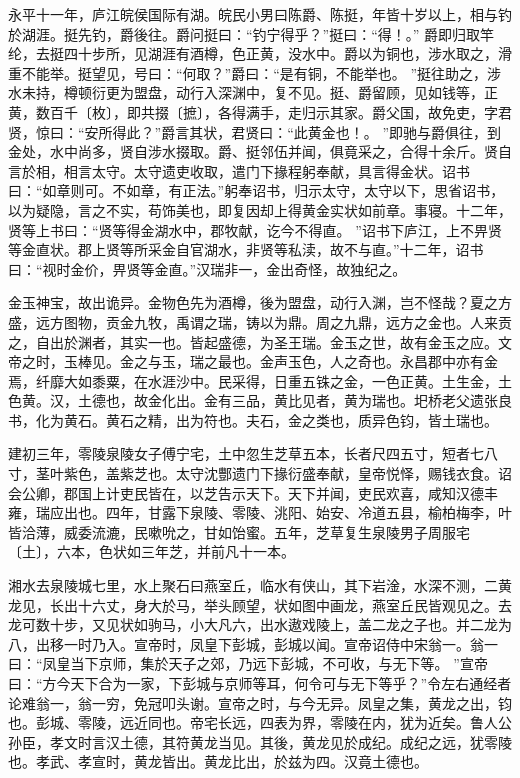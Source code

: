 \documentclass[]{article}
\begin{document}
永平十一年，庐江皖侯国际有湖。皖民小男曰陈爵、陈挺，年皆十岁以上，相与钓於湖涯。挺先钓，爵後往。爵问挺曰：``钓宁得乎？''挺曰：``得！。''
爵即归取竿纶，去挺四十步所，见湖涯有酒樽，色正黄，没水中。爵以为铜也，涉水取之，滑重不能举。挺望见，号曰：``何取？''爵曰：``是有铜，不能举也。
''挺往助之，涉水未持，樽顿衍更为盟盘，动行入深渊中，复不见。挺、爵留顾，见如钱等，正黄，数百千〔枚〕，即共掇〔摭〕，各得满手，走归示其家。爵父国，故免吏，字君贤，惊曰：``安所得此？''爵言其状，君贤曰：``此黄金也！。
''即驰与爵俱往，到金处，水中尚多，贤自涉水掇取。爵、挺邻伍并闻，俱竟采之，合得十余斤。贤自言於相，相言太守。太守遗吏收取，遣门下掾程躬奉献，具言得金状。诏书曰：``如章则可。不如章，有正法。''躬奉诏书，归示太守，太守以下，思省诏书，以为疑隐，言之不实，苟饰美也，即复因却上得黄金实状如前章。事寝。十二年，贤等上书曰：``贤等得金湖水中，郡牧献，讫今不得直。
''诏书下庐江，上不畀贤等金直状。郡上贤等所采金自官湖水，非贤等私渎，故不与直。''十二年，诏书曰：``视时金价，畀贤等金直。''汉瑞非一，金出奇怪，故独纪之。

金玉神宝，故出诡异。金物色先为酒樽，後为盟盘，动行入渊，岂不怪哉？夏之方盛，远方图物，贡金九牧，禹谓之瑞，铸以为鼎。周之九鼎，远方之金也。人来贡之，自出於渊者，其实一也。皆起盛德，为圣王瑞。金玉之世，故有金玉之应。文帝之时，玉棒见。金之与玉，瑞之最也。金声玉色，人之奇也。永昌郡中亦有金焉，纤靡大如黍粟，在水涯沙中。民采得，日重五铢之金，一色正黄。土生金，土色黄。汉，土德也，故金化出。金有三品，黄比见者，黄为瑞也。圯桥老父遗张良书，化为黄石。黄石之精，出为符也。夫石，金之类也，质异色钧，皆土瑞也。

建初三年，零陵泉陵女子傅宁宅，土中忽生芝草五本，长者尺四五寸，短者七八寸，茎叶紫色，盖紫芝也。太守沈酆遗门下掾衍盛奉献，皇帝悦怿，赐钱衣食。诏会公卿，郡国上计吏民皆在，以芝告示天下。天下并闻，吏民欢喜，咸知汉德丰雍，瑞应出也。四年，甘露下泉陵、零陵、洮阳、始安、冷道五县，榆柏梅李，叶皆洽薄，威委流漉，民嗽吮之，甘如饴蜜。五年，芝草复生泉陵男子周服宅〔土〕，六本，色状如三年芝，并前凡十一本。

湘水去泉陵城七里，水上聚石曰燕室丘，临水有侠山，其下岩淦，水深不测，二黄龙见，长出十六丈，身大於马，举头顾望，状如图中画龙，燕室丘民皆观见之。去龙可数十步，又见状如驹马，小大凡六，出水遨戏陵上，盖二龙之子也。并二龙为八，出移一时乃入。宣帝时，凤皇下彭城，彭城以闻。宣帝诏侍中宋翁一。翁一曰：``凤皇当下京师，集於天子之郊，乃远下彭城，不可收，与无下等。
''宣帝曰：``方今天下合为一家，下彭城与京师等耳，何令可与无下等乎？''令左右通经者论难翁一，翁一穷，免冠叩头谢。宣帝之时，与今无异。凤皇之集，黄龙之出，钧也。彭城、零陵，远近同也。帝宅长远，四表为界，零陵在内，犹为近矣。鲁人公孙臣，孝文时言汉土德，其符黄龙当见。其後，黄龙见於成纪。成纪之远，犹零陵也。孝武、孝宣时，黄龙皆出。黄龙比出，於兹为四。汉竟土德也。
\end{document}

